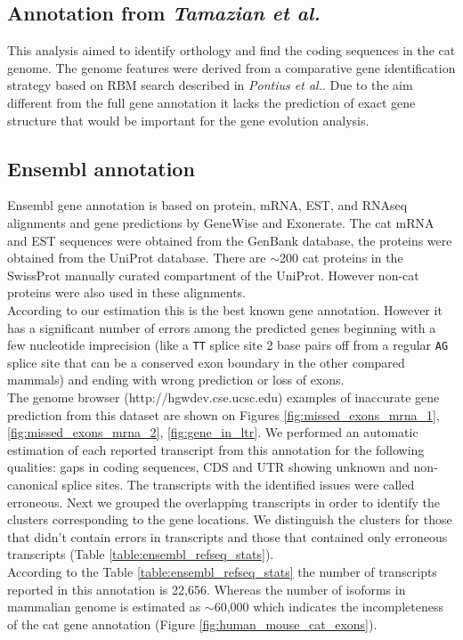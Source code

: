 \documentclass{article}
\begin{document}
\subsection{Annotation from \textit{Tamazian et al.}}
This analysis aimed to identify orthology and find the coding sequences in the cat genome.
The genome features were derived from a comparative gene identification strategy based on RBM search described in \textit{Pontius et al.}.
Due to the aim different from the full gene annotation it lacks the prediction of exact gene structure that would be important for the gene evolution analysis. 

\subsection{Ensembl annotation}
Ensembl gene annotation is based on protein, mRNA, EST, and RNAseq alignments and gene predictions by GeneWise and Exonerate. The cat mRNA and EST sequences were obtained from the GenBank database, the proteins were obtained from the UniProt database. There are $\sim$200 cat proteins in the SwissProt manually curated compartment of the UniProt. However non-cat proteins  were also used in these alignments.\\
According to our estimation this is the best known gene annotation. 
However it has a significant number of errors among the predicted genes beginning with a few nucleotide imprecision (like a \texttt{TT} splice site 2 base pairs off from a regular \texttt{AG} splice site that can be a conserved exon boundary in the other compared mammals) and ending with wrong prediction or loss of exons.\\
The genome browser (http://hgwdev.cse.ucsc.edu) examples of inaccurate gene prediction from this dataset are shown on Figures \ref{fig:missed_exons_mrna_1}, \ref{fig:missed_exons_mrna_2}, \ref{fig:gene_in_ltr}.
We performed an automatic estimation of each reported transcript from this annotation for the following qualities: gaps in coding sequences, CDS and UTR showing unknown and non-canonical splice sites. The transcripts with the identified issues were called erroneous. Next we grouped the overlapping transcripts in order to identify the clusters corresponding to the gene locations. We distinguish the clusters for those that didn’t contain errors in transcripts and those that contained only erroneous transcripts (Table \ref{table:ensembl_refseq_stats}). \\
According to the Table \ref{table:ensembl_refseq_stats} the number of transcripts reported in this annotation is 22{,}656. Whereas the  number of isoforms in mammalian genome is estimated as $\sim$60{,}000 which indicates the incompleteness of the cat gene annotation (Figure \ref{fig:human_mouse_cat_exons}).
\end{document}
